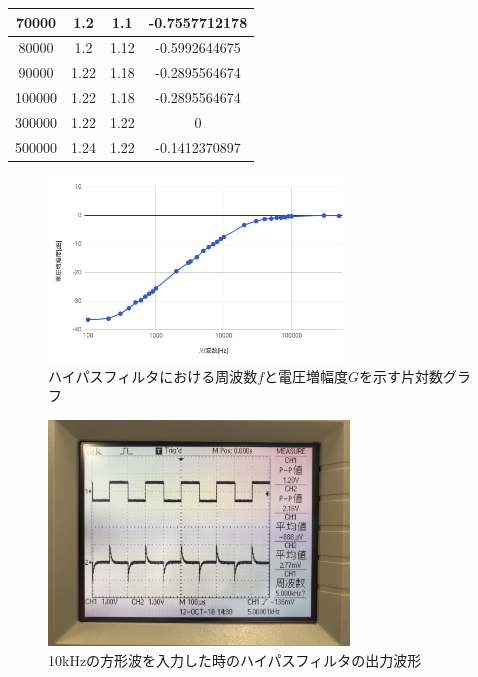 \documentclass[a4paper,11pt,uplatex]{jsarticle}
\begin{document}
\begin{table}[H]
\begin{center}
\begin{tabular}[H]{|c|c|c|c|}
      70000 & 1.2 & 1.1 & -0.7557712178 \\ \hline
      80000 & 1.2 & 1.12 & -0.5992644675 \\ \hline
      90000 & 1.22 & 1.18 & -0.2895564674 \\ \hline
      100000 & 1.22 & 1.18 & -0.2895564674 \\ \hline
      300000 & 1.22 & 1.22 & 0 \\ \hline
      500000 & 1.24 & 1.22 & -0.1412370897 \\ \hline
    \end{tabular}
\end{center}
\end{table}

\begin{figure}[H]
	\begin{center}
		\includegraphics[width=8cm]{画像/ハイパス方対数.png}
		\caption{ハイパスフィルタにおける周波数$f$と電圧増幅度$G$を示す片対数グラフ}
		\label{ハイパス片対数}
	\end{center}
\end{figure}

\begin{figure}[H]
	\begin{center}
		\includegraphics[width=8cm]{画像/ハイパス方形波.jpg}
		\caption{10kHzの方形波を入力した時のハイパスフィルタの出力波形}
		\label{ハイパス方形波}
	\end{center}
\end{figure}
\end{document}
